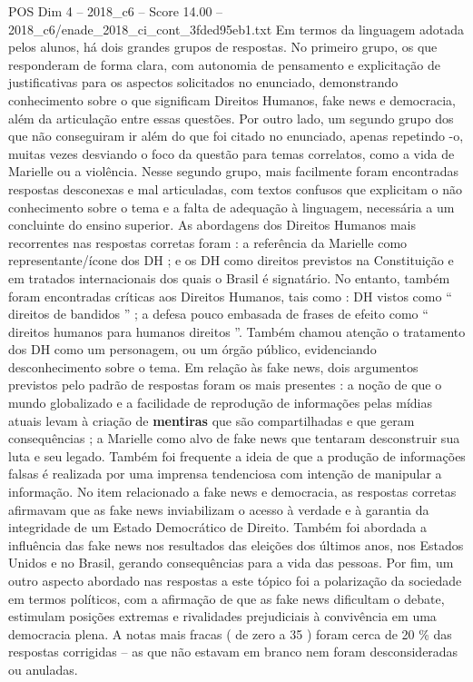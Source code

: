 \begin{textsample}{POS Dim 4 – 2018\_c6 – Score 14.00 – 2018\_c6/enade\_2018\_ci\_cont\_3fded95eb1.txt}
Em termos da linguagem adotada pelos alunos, há dois grandes grupos de respostas.
No primeiro grupo, os que responderam de forma clara, com autonomia de pensamento e explicitação de justificativas para os aspectos solicitados no enunciado, demonstrando conhecimento sobre o que significam Direitos Humanos, fake news e democracia, além da articulação entre essas questões.
Por outro lado, um segundo grupo dos que não conseguiram ir além do que foi citado no enunciado, apenas repetindo -o, muitas vezes desviando o foco da questão para temas correlatos, como a vida de Marielle ou a violência.
Nesse segundo grupo, mais facilmente foram encontradas respostas desconexas e mal articuladas, com textos confusos que explicitam o não conhecimento sobre o tema e a falta de adequação à linguagem, necessária a um concluinte do ensino superior.
As abordagens dos Direitos Humanos mais recorrentes nas respostas corretas foram : a referência da Marielle como representante/ícone dos DH ; e os DH como direitos previstos na Constituição e em tratados internacionais dos quais o Brasil é signatário.
No entanto, também foram encontradas críticas aos Direitos Humanos, tais como : DH vistos como “ direitos de bandidos ” ; a defesa pouco embasada de frases de efeito como “ direitos humanos para humanos direitos ”.
Também chamou atenção o tratamento dos DH como um personagem, ou um órgão público, evidenciando desconhecimento sobre o tema.
Em relação às fake news, dois argumentos previstos pelo padrão de respostas foram os mais presentes : a noção de que o mundo globalizado e a facilidade de reprodução de informações pelas mídias atuais levam à criação de \textbf{mentiras} que são compartilhadas e que geram consequências ; a Marielle como alvo de fake news que tentaram desconstruir sua luta e seu legado.
Também foi frequente a ideia de que a produção de informações falsas é realizada por uma imprensa tendenciosa com intenção de manipular a informação.
No item relacionado a fake news e democracia, as respostas corretas afirmavam que as fake news inviabilizam o acesso à verdade e à garantia da integridade de um Estado Democrático de Direito.
Também foi abordada a influência das fake news nos resultados das eleições dos últimos anos, nos Estados Unidos e no Brasil, gerando consequências para a vida das pessoas.
Por fim, um outro aspecto abordado nas respostas a este tópico foi a polarização da sociedade em termos políticos, com a afirmação de que as fake news dificultam o debate, estimulam posições extremas e rivalidades prejudiciais à convivência em uma democracia plena.
A notas mais fracas ( de zero a 35 ) foram cerca de 20 \% das respostas corrigidas – as que não estavam em branco nem foram desconsideradas ou anuladas.

\end{textsample}
